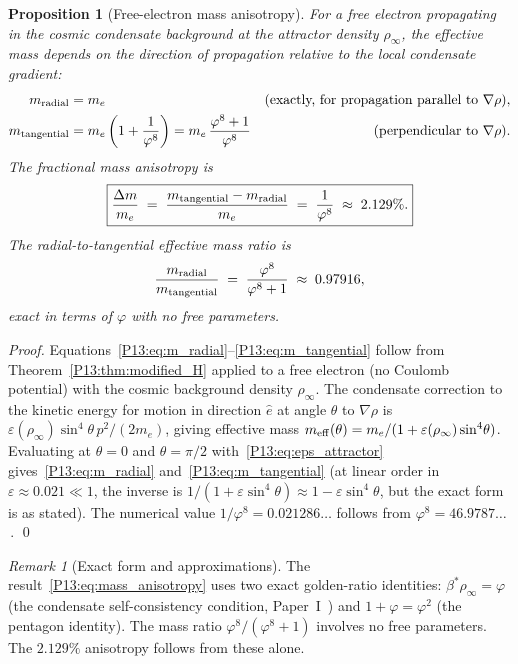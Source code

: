 \documentclass[11pt,a4paper]{article}
\newtheorem{proposition}[theorem]{Proposition}
\theoremstyle{definition}
\theoremstyle{remark}
\newtheorem{remark}[theorem]{Remark}
\newcommand{\vp}{\varphi}
\newcommand{\bst}{\beta^{*}}
\newcommand{\eps}{\varepsilon}
\newcommand{\rhoinf}{\rho_{\infty}}
\begin{document}
\begin{proposition}[Free-electron mass anisotropy]
\label{P13:prop:mass_anisotropy}
For a free electron propagating in the cosmic condensate background
at the attractor density $\rhoinf$, the effective mass depends on
the direction of propagation relative to the local condensate gradient:
\begin{align}
  m_{\rm radial}
  &= m_e
  &\text{(exactly, for propagation parallel to } \nabla\rho\text{)},
  \label{P13:eq:m_radial}
  \\
  m_{\rm tangential}
  &= m_e\left(1 + \frac{1}{\vp^8}\right)
   = m_e\,\frac{\vp^8+1}{\vp^8}
  &\text{(perpendicular to } \nabla\rho\text{)}.
  \label{P13:eq:m_tangential}
\end{align}
The fractional mass anisotropy is
\begin{equation}
  \boxed{\frac{\Delta m}{m_e}
  \;=\; \frac{m_{\rm tangential} - m_{\rm radial}}{m_e}
  \;=\; \frac{1}{\vp^8}
  \;\approx\; 2.129\%.}
  \label{P13:eq:mass_anisotropy}
\end{equation}
The radial-to-tangential effective mass ratio is
\begin{equation}
  \frac{m_{\rm radial}}{m_{\rm tangential}}
  \;=\; \frac{\vp^8}{\vp^8+1}
  \;\approx\; 0.97916,
  \label{P13:eq:mass_ratio}
\end{equation}
exact in terms of $\vp$ with no free parameters.
\end{proposition}

\begin{proof}
Equations~\eqref{P13:eq:m_radial}--\eqref{P13:eq:m_tangential} follow from
Theorem~\ref{P13:thm:modified_H} applied to a free electron
(no Coulomb potential) with the cosmic background density $\rhoinf$.
The condensate correction to the kinetic energy for motion in
direction $\hat{e}$ at angle $\theta$ to $\nabla\rho$ is
$\eps(\rhoinf)\sin^4\!\theta\,p^2/(2m_e)$, giving effective mass
$m_{\rm eff}(\theta) = m_e/(1+\eps(\rhoinf)\sin^4\!\theta)$.
Evaluating at $\theta=0$ and $\theta=\pi/2$ with~\eqref{P13:eq:eps_attractor}
gives~\eqref{P13:eq:m_radial} and~\eqref{P13:eq:m_tangential}
(at linear order in $\eps\approx0.021\ll1$, the inverse is
$1/(1+\eps\sin^4\!\theta)\approx1-\eps\sin^4\!\theta$,
but the exact form is as stated).
The numerical value $1/\vp^8 = 0.021286\ldots$ follows
from $\vp^8 = 46.9787\ldots$\,.
\qed
\end{proof}

\begin{remark}[Exact form and approximations]
\label{P13:rem:exact_vs_approx}
The result~\eqref{P13:eq:mass_anisotropy} uses two exact golden-ratio
identities: $\bst\rhoinf=\vp$ (the condensate self-consistency
condition, Paper~I~\cite{Paper1}) and $1+\vp=\vp^2$
(the pentagon identity).
The mass ratio $\vp^8/(\vp^8+1)$ involves no free parameters.
The $2.129\%$ anisotropy follows from these alone.
\end{remark}
\end{document}
